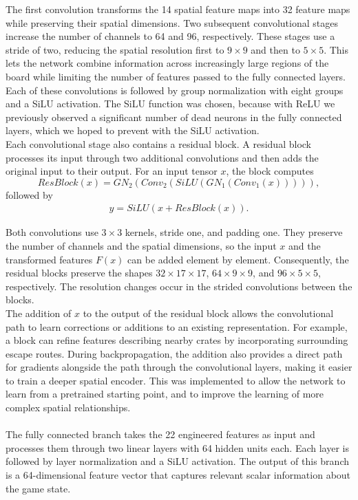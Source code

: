 \documentclass[11pt,a4paper]{article}
\begin{document}
The first convolution transforms the 14 spatial feature maps into 32 feature maps while preserving their spatial dimensions. Two subsequent convolutional stages increase the number of channels to 64 and 96, respectively. These stages use a stride of two, reducing the spatial resolution first to \(9\times9\) and then to \(5\times5\). This lets the network combine information across increasingly large regions of the board while limiting the number of features passed to the fully connected layers. Each of these convolutions is followed by group normalization with eight groups and a SiLU activation. The SiLU function was chosen, because with ReLU we previously observed a significant number of dead neurons in the fully connected layers, which we hoped to prevent with the SiLU activation.\\
Each convolutional stage also contains a residual block. A residual block processes its input through two additional convolutions and then adds the original input to their output. For an input tensor \(x\), the block computes
\begin{equation}
    ResBlock (x) = GN_2(Conv_2(SiLU(GN_1(Conv_1(x))))),
\end{equation}
followed by
\begin{align}
    y = SiLU(x + ResBlock(x)).
\end{align}

Both convolutions use \(3\times3\) kernels, stride one, and padding one. They preserve the number of channels and the spatial dimensions, so the input \(x\) and the transformed features \(F(x)\) can be added element by element. Consequently, the residual blocks preserve the shapes \(32\times17\times17\), \(64\times9\times9\), and \(96\times5\times5\), respectively. The resolution changes occur in the strided convolutions between the blocks.\\
The addition of \(x\) to the output of the residual block allows the convolutional path to learn corrections or additions to an existing representation. For example, a block can refine features describing nearby crates by incorporating surrounding escape routes. During backpropagation, the addition also provides a direct path for gradients alongside the path through the convolutional layers, making it easier to train a deeper spatial encoder. This was implemented to allow the network to learn from a pretrained starting point, and to improve the learning of more complex spatial relationships.\\\\
The fully connected branch takes the 22 engineered features as input and processes them through two linear layers with 64 hidden units each. Each layer is followed by layer normalization and a SiLU activation. The output of this branch is a 64-dimensional feature vector that captures relevant scalar information about the game state.
\end{document}
